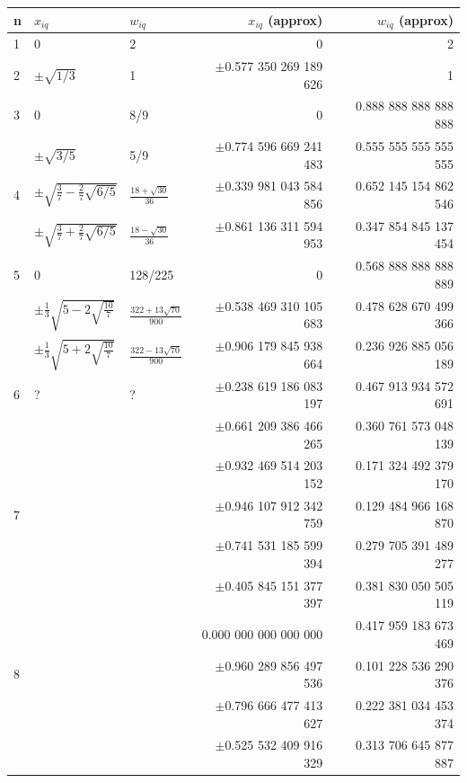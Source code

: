 \begin{center}
\begin{tabular}{lllrr}
\hline
n & $x_{iq}$ & $w_{iq}$ & $x_{iq}$ (approx) & $w_{iq}$ (approx) \\
\hline\hline
1 & 0 & 2 & 0 & 2 \\
\hline
2 & $\pm \sqrt{1/3}$ & 1  & $\pm$0.577 350 269 189 626 & 1 \\
\hline
3 & 0 & 8/9 & 0                                          & 0.888 888 888 888 888 \\
  & $\pm\sqrt{3/5}$  & 5/9  & $\pm$0.774 596 669 241 483 & 0.555 555 555 555 555 \\
\hline
4 & $\pm\sqrt{\frac{3}{7} - \frac{2}{7}\sqrt{6/5}}$  & $\frac{18+\sqrt{30}}{36}$ & $\pm$0.339 981 043 584 856 & 0.652 145 154 862 546 \\
  & $\pm\sqrt{\frac{3}{7} + \frac{2}{7}\sqrt{6/5}}$  & $\frac{18-\sqrt{30}}{36}$ & $\pm$0.861 136 311 594 953 & 0.347 854 845 137 454 \\
\hline
5 & 0 & 128/225                                    & 0                                                          & 0.568 888 888 888 889 \\
  & $\pm\frac{1}{3}\sqrt{5-2\sqrt{\frac{10}{7}}}$  & $\frac{322+13\sqrt{70}}{900}$ & $\pm$0.538 469 310 105 683 & 0.478 628 670 499 366 \\
  & $\pm\frac{1}{3}\sqrt{5+2\sqrt{\frac{10}{7}}}$  & $\frac{322-13\sqrt{70}}{900}$ & $\pm$0.906 179 845 938 664 & 0.236 926 885 056 189 \\
\hline
6 & ?& ?& $\pm$0.238 619 186 083 197 & 0.467 913 934 572 691\\
  &  &  & $\pm$0.661 209 386 466 265 & 0.360 761 573 048 139\\
  &  &  & $\pm$0.932 469 514 203 152 & 0.171 324 492 379 170\\
\hline
7 & & & $\pm$0.946 107 912 342 759 & 0.129 484 966 168 870\\
  & & & $\pm$0.741 531 185 599 394 & 0.279 705 391 489 277\\
  & & & $\pm$0.405 845 151 377 397 & 0.381 830 050 505 119\\
  & & & 0.000 000 000 000 000 & 0.417 959 183 673 469\\
\hline
8 & & & $\pm$0.960 289 856 497 536 & 0.101 228 536 290 376\\
  & & & $\pm$0.796 666 477 413 627 & 0.222 381 034 453 374\\
  & & & $\pm$0.525 532 409 916 329 & 0.313 706 645 877 887\\

\end{tabular}
\end{center}
